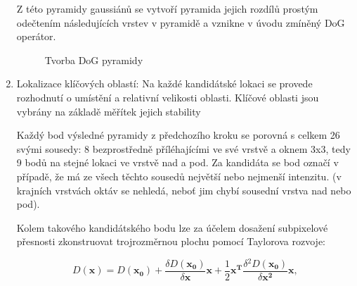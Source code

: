 \begin{enumerate}
			Z této pyramidy gaussiánů se vytvoří pyramida jejich rozdílů prostým odečtením následujících vrstev v pyramidě a vznikne v úvodu zmíněný DoG operátor.		
			
		\begin{figure}[!ht] 
			\caption{Tvorba DoG pyramidy} 	\label{sift_dog}
		\end{figure} 
			
		\item Lokalizace klíčových oblastí: Na každé kandidátské lokaci se provede rozhodnutí o umístění a relativní velikosti oblasti. Klíčové oblasti jsou vybrány na základě měřítek jejich stability
		
			Každý bod výsledné pyramidy z předchozího kroku se porovná s celkem 26 svými sousedy: 8 bezprostředně příléhajícími ve své vrstvě a oknem 3x3, tedy 9 bodů na stejné lokaci ve vrstvě nad a pod. Za kandidáta se bod označí v případě, že má ze všech těchto sousedů největší nebo nejmenší intenzitu. (v krajních vrstvách oktáv se nehledá, neboť jim chybí sousední vrstva nad nebo pod).
			
			Kolem takového kandidátského bodu lze za účelem dosažení subpixelové přesnosti zkonstruovat trojrozměrnou plochu pomocí Taylorova rozvoje:
			
			\begin{equation}
			\label{rozvoj}
			D(\mathbf{x}) = D(\mathbf{x_0}) + \frac{\delta D(\mathbf{x_0})}{\delta \mathbf{x}} \mathbf{x} + \frac{1}{2} \mathbf{x^T}\frac{\delta{}^2 D(\mathbf{x_0})}{\delta{}\mathbf{x^2}}\mathbf{x}, 
			\end{equation}
			

\end{enumerate}
